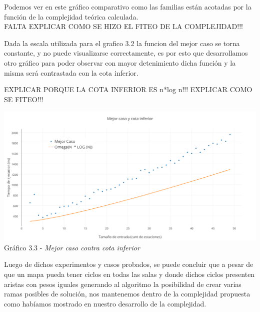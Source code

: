 Podemos ver en este gr\'afico comparativo como las familias est\'an acotadas por la funci\'on de la complejidad te\'orica calculada.\\

FALTA EXPLICAR COMO SE HIZO EL FITEO DE LA COMPLEJIDAD!!!
  
Dada la escala utilizada para el grafico 3.2 la funcion del mejor caso se torna constante, y no puede visualizarse correctamente, es por esto que desarrollamos otro gr\'afico para poder observar con mayor detenimiento dicha funci\'on y la misma ser\'a contrastada con la cota inferior.
  
EXPLICAR PORQUE LA COTA INFERIOR ES n*log n!!! EXPLICAR COMO SE FITEO!!!  

  \vspace*{0.3cm} \vspace*{0.3cm}
  \begin{center}
\includegraphics[scale=0.5]{./EJ3/Mejorcasoycotainferior.png}
{Gr\'afico 3.3 - \textit{Mejor caso contra cota inferior}}
  \end{center}
  \vspace*{0.3cm}

Luego de dichos experimentos y casos probados, se puede concluir que a pesar de que un mapa pueda tener ciclos en todas las salas y donde dichos ciclos presenten aristas con pesos iguales generando al algoritmo la posibilidad de crear varias ramas posibles de soluci\'on, nos mantenemos dentro de la complejidad propuesta como hab\'iamos mostrado en nuestro desarrollo de la complejidad.\\
